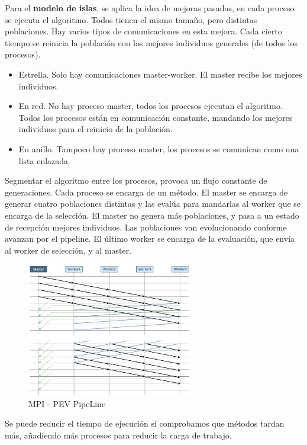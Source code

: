 	Para el \textbf{modelo de islas}, se aplica la idea de mejoras pasadas, en cada proceso se ejecuta el algoritmo. Todos tienen el mismo tamaño, pero distintas poblaciones. Hay varios tipos de comunicaciones en esta mejora. Cada cierto tiempo se reinicia la población con los mejores individuos generales (de todos los procesos).

	\begin{itemize}
		\item Estrella. Solo hay comunicaciones master-worker. El master recibe los mejores individuos.
		\item En red. No hay proceso master, todos los procesos ejecutan el algoritmo. Todos los procesos están en comunicación constante, mandando los mejores individuos para el reinicio de la población.
		\item En anillo. Tampoco hay proceso master, los procesos se comunican como una lista enlazada.
	\end{itemize}
	
	Segmentar el algoritmo entre los procesos, provoca un flujo constante de generaciones. Cada proceso se encarga de un método. El master se encarga de generar cuatro poblaciones distintas y las evalúa para mandarlas al worker que se encarga de la selección. El master no genera más poblaciones, y pasa a un estado de recepción mejores individuos. Las poblaciones van evolucionando conforme avanzan por el pipeline. El último worker se encarga de la evaluación, que envía al worker de selección, y al master.
	
	\begin{figure}[!h]
		\centering
		\includegraphics[width=0.65\textwidth]{images/chapter_3/pev_mpi3}
		\caption{MPI - PEV PipeLine}
		\label{fig:pevpipe}
	\end{figure}

	Se puede reducir el tiempo de ejecución si comprobamos que métodos tardan más, añadiendo más procesos para reducir la carga de trabajo.
	
